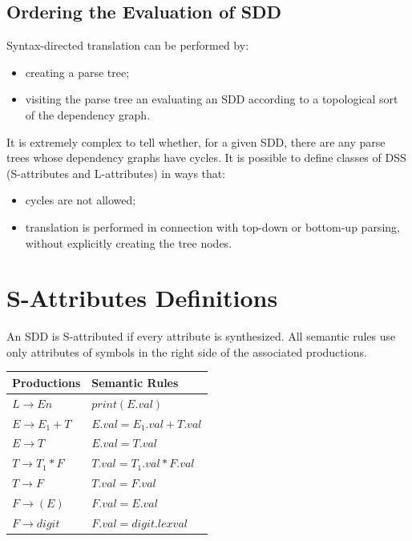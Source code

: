 \subsection{Ordering the Evaluation of SDD}
Syntax-directed translation can be performed by:
\begin{itemize}
	\item creating a parse tree;
	\item visiting the parse tree an evaluating an SDD according to a topological sort of the dependency graph.
\end{itemize}
It is extremely complex to tell whether, for a given SDD, there are any parse trees whose dependency graphs have cycles.
It is possible to define classes of DSS (S-attributes and L-attributes) in ways that:
\begin{itemize}
	\item cycles are not allowed;
	\item translation is performed in connection with top-down or bottom-up parsing, without explicitly creating the tree nodes.
\end{itemize}

\section{S-Attributes Definitions}
An SDD is S-attributed if every attribute is synthesized.
All semantic rules use only attributes of symbols in the right side of the associated productions.

\begin{table}[h]
	\centering
	\begin{tabular}{l|l}
		Productions & Semantic Rules \\ \hline
		$L \to En$ & $print(E.val)$ \\ \hline
		$E \to E_1 + T$ & $E.val = E_1.val + T.val$ \\ \hline
		$E \to T$ & $E.val = T.val$ \\ \hline
		$T \to T_1 \ast F$ & $T.val = T_1.val \ast F.val$ \\ \hline
		$T \to F$ & $T.val = F.val$ \\ \hline
		$F \to (E)$ & $F.val = E.val$ \\ \hline
		$F \to digit$ & $F.val = digit.lexval$ 
	\end{tabular}
\end{table}

